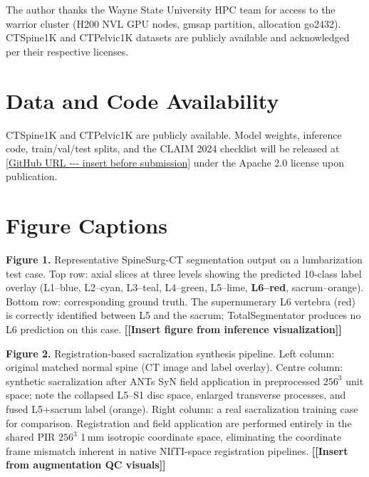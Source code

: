 \documentclass{article}
\newcommand{\ph}[1]{\textcolor{placeholder}{\textbf{[#1]}}}
\begin{document}
The author thanks the Wayne State University HPC team for access to the warrior
cluster (H200 NVL GPU nodes, gmsap partition, allocation go2432). CTSpine1K and
CTPelvic1K datasets are publicly available and acknowledged per their respective
licenses.

\section*{Data and Code Availability}

CTSpine1K and CTPelvic1K are publicly available. Model weights, inference code,
train/val/test splits, and the CLAIM 2024 checklist will be released at
\url{[GitHub URL --- insert before submission]} under the Apache 2.0 license
upon publication.

\section*{Figure Captions}

\noindent\textbf{Figure 1.} Representative SpineSurg-CT segmentation output on
a lumbarization test case. Top row: axial slices at three levels showing the
predicted 10-class label overlay (L1--blue, L2--cyan, L3--teal, L4--green,
L5--lime, \textbf{L6--red}, sacrum--orange). Bottom row: corresponding ground
truth. The supernumerary L6 vertebra (red) is correctly identified between L5
and the sacrum; TotalSegmentator produces no L6 prediction on this case.
\ph{[Insert figure from inference visualization]}
\label{fig:l6_example}

\vspace{0.5em}
\noindent\textbf{Figure 2.} Registration-based sacralization synthesis pipeline.
Left column: original matched normal spine (CT image and label overlay). Centre
column: synthetic sacralization after ANTs SyN field application in preprocessed
$256^3$ unit space; note the collapsed L5--S1 disc space, enlarged transverse
processes, and fused L5+sacrum label (orange). Right column: a real sacralization
training case for comparison. Registration and field application are performed
entirely in the shared PIR $256^3$ 1\,mm isotropic coordinate space, eliminating
the coordinate frame mismatch inherent in native NIfTI-space registration pipelines.
\ph{[Insert from augmentation QC visuals]}



\end{document}

